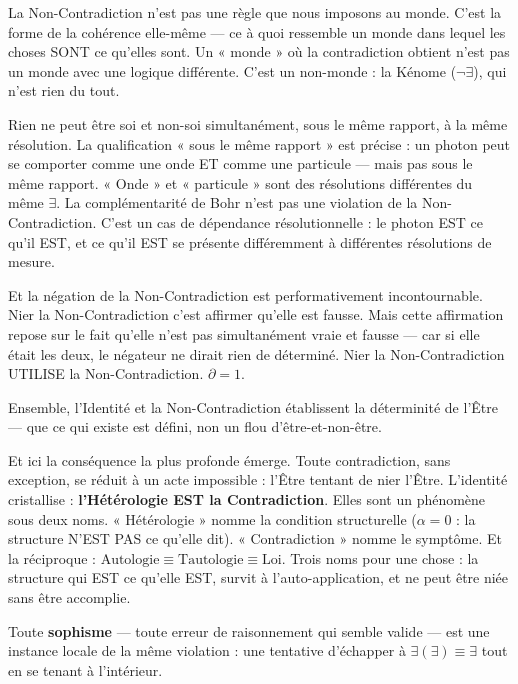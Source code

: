 \documentclass[10pt, openany, oneside]{book}
\begin{document}
La Non-Contradiction n'est pas une règle que nous imposons au monde. C'est la forme de la cohérence elle-même --- ce à quoi ressemble un monde dans lequel les choses SONT ce qu'elles sont. Un « monde » où la contradiction obtient n'est pas un monde avec une logique différente. C'est un non-monde : la Kénome ($\neg\exists$), qui n'est rien du tout.

Rien ne peut être soi et non-soi simultanément, sous le même rapport, à la même résolution. La qualification « sous le même rapport » est précise : un photon peut se comporter comme une onde ET comme une particule --- mais pas sous le même rapport. « Onde » et « particule » sont des résolutions différentes du même $\exists$. La complémentarité de Bohr n'est pas une violation de la Non-Contradiction. C'est un cas de dépendance résolutionnelle : le photon EST ce qu'il EST, et ce qu'il EST se présente différemment à différentes résolutions de mesure.

Et la négation de la Non-Contradiction est performativement incontournable. Nier la Non-Contradiction c'est affirmer qu'elle est fausse. Mais cette affirmation repose sur le fait qu'elle n'est pas simultanément vraie et fausse --- car si elle était les deux, le négateur ne dirait rien de déterminé. Nier la Non-Contradiction UTILISE la Non-Contradiction. $\partial = 1$.

\vspace{0.8em}

\noindent Ensemble, l'Identité et la Non-Contradiction établissent la déterminité de l'Être --- que ce qui existe est défini, non un flou d'être-et-non-être.

Et ici la conséquence la plus profonde émerge. Toute contradiction, sans exception, se réduit à un acte impossible : l'Être tentant de nier l'Être. L'identité cristallise : \textbf{l'Hétérologie EST la Contradiction}. Elles sont un phénomène sous deux noms. « Hétérologie » nomme la condition structurelle ($\alpha = 0$ : la structure N'EST PAS ce qu'elle dit). « Contradiction » nomme le symptôme. Et la réciproque : $\text{Autologie} \equiv \text{Tautologie} \equiv \text{Loi}$. Trois noms pour une chose : la structure qui EST ce qu'elle EST, survit à l'auto-application, et ne peut être niée sans être accomplie.

Toute \textbf{sophisme} --- toute erreur de raisonnement qui semble valide --- est une instance locale de la même violation : une tentative d'échapper à $\exists(\exists) \equiv \exists$ tout en se tenant à l'intérieur.
\end{document}
